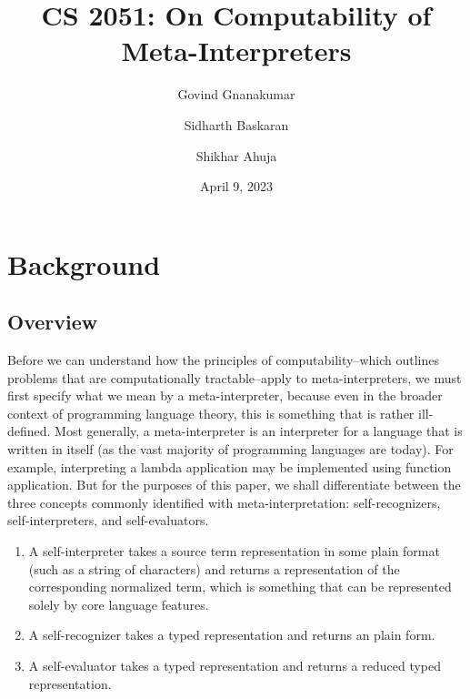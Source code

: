 \documentclass{article}
\title{CS 2051: On Computability of Meta-Interpreters}
\author[1]{Govind Gnanakumar}
\author[1]{Sidharth Baskaran}
\author[1]{Shikhar Ahuja}
\affil[1]{College of Computing, Georgia Institute of Technology}
\date{April 9, 2023}
\begin{document}
\maketitle

\section{Background}

\subsection{Overview}

Before we can understand how the principles of computability--which outlines problems that are computationally tractable--apply to meta-interpreters, we must first specify what we mean by a meta-interpreter, because even in the broader context of programming language theory, this is something that is rather ill-defined. Most generally, a meta-interpreter is an interpreter for a language that is written in itself (as the vast majority of programming languages are today). For example, interpreting a lambda application may be implemented using function application. But for the purposes of this paper, we shall differentiate between the three concepts commonly identified with meta-interpretation: self-recognizers, self-interpreters, and self-evaluators.
\begin{enumerate}
    \item A self-interpreter takes a source term representation in some plain format (such as a string of characters) and returns a representation of the corresponding normalized term, which is something that can be represented solely by core language features.
    \item A self-recognizer takes a typed representation and returns an plain form.
    \item A self-evaluator takes a typed representation and returns a reduced typed representation.
\end{enumerate}

\end{document}
